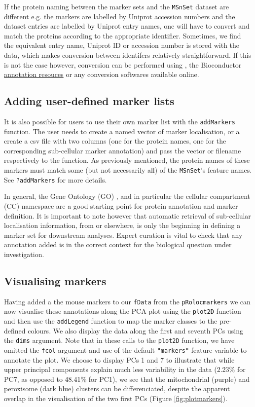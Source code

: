 If the protein naming between the marker sets and the \texttt{MSnSet}
dataset are different e.g. the markers are labelled by Uniprot
accession numbers and the dataset entries are labelled by Uniprot
entry names, one will have to convert and match the proteins according
to the appropriate identifier. Sometimes, we find the equivalent entry
name, Uniprot ID or accession number is stored with the data, which
makes conversion between identifers relatively straightforward. If
this is not the case however, conversion can be performed using
, the Bioconductor
\href{http://bioconductor.org/help/workflows/annotation/Annotation_Resources/}{annotation
  resouces} or any conversion softwares available online.

\subsection*{Adding user-defined marker lists}
It is also possible for users to use their own marker list with the
\texttt{addMarkers} function. The user needs to create a named vector
of marker localisation, or a create a csv file with two columns (one
for the protein names, one for the corresponding sub-cellular marker
annotation) and pass the vector or filename respectively to the
function. As previously mentioned, the protein names of these markers
must match some (but not necessarily all) of the \texttt{MSnSet}'s
feature names. See \texttt{?addMarkers} for more details.

In general, the Gene Ontology (GO) \cite{Ashburner:2000}, and in
particular the cellular compartment (CC) namespace are a good starting
point for protein annotation and marker definition. It is important to
note however that automatic retrieval of sub-cellular localisation
information, from  or elsewhere, is only the
beginning in defining a marker set for downstream analyses. Expert
curation is vital to check that any annotation added is in the correct
context for the biological question under investigation.


\subsection*{Visualising markers}
Having added a the mouse markers to our \texttt{fData} from the
\texttt{pRolocmarkers} we can now visualise these annotations along
the PCA plot using the \texttt{plot2D} function and then use the
\texttt{addLegend} function to map the marker classes to the
pre-defined colours. We also display the data along the first and
seventh PCs using the \texttt{dims} argument. Note that in these calls
to the \texttt{plot2D} function, we have omitted the \texttt{fcol}
argument and use of the default \texttt{"markers"} feature variable to
annotate the plot. We choose to display PCs 1 and 7 to illustrate that
while upper principal components explain much less variability in the
data (2.23\% for PC7, as opposed to 48.41\% for PC1), we see that the
mitochondrial (purple) and peroxisome (dark blue) clusters can be
differenciated, despite the apparent overlap in the visualisation of
the two first PCs (Figure \ref{fig:plotmarkers}).

